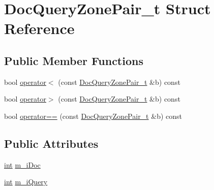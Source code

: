 \hypertarget{structDocQueryZonePair__t}{\section{Doc\-Query\-Zone\-Pair\-\_\-t Struct Reference}
\label{structDocQueryZonePair__t}
}
\subsection*{Public Member Functions}
\begin{DoxyCompactItemize}
\item 
bool \hyperlink{structDocQueryZonePair__t_af01a57343509a03463042d626073ead2}{operator$<$} (const \hyperlink{structDocQueryZonePair__t}{Doc\-Query\-Zone\-Pair\-\_\-t} \&b) const 
\item 
bool \hyperlink{structDocQueryZonePair__t_a8bbb87e2501623712768b34b341e5bdb}{operator$>$} (const \hyperlink{structDocQueryZonePair__t}{Doc\-Query\-Zone\-Pair\-\_\-t} \&b) const 
\item 
bool \hyperlink{structDocQueryZonePair__t_adb650c75025110eb29dc87d35c51546b}{operator==} (const \hyperlink{structDocQueryZonePair__t}{Doc\-Query\-Zone\-Pair\-\_\-t} \&b) const 
\end{DoxyCompactItemize}
\subsection*{Public Attributes}
\begin{DoxyCompactItemize}
\item 
\hyperlink{sphinxexpr_8cpp_a4a26e8f9cb8b736e0c4cbf4d16de985e}{int} \hyperlink{structDocQueryZonePair__t_aba3efaff10591a3a83afe5f93e248572}{m\-\_\-i\-Doc}
\item 
\hyperlink{sphinxexpr_8cpp_a4a26e8f9cb8b736e0c4cbf4d16de985e}{int} \hyperlink{structDocQueryZonePair__t_a7dfe0fa04b887c49a057105af857dd15}{m\-\_\-i\-Query}
\end{DoxyCompactItemize}


